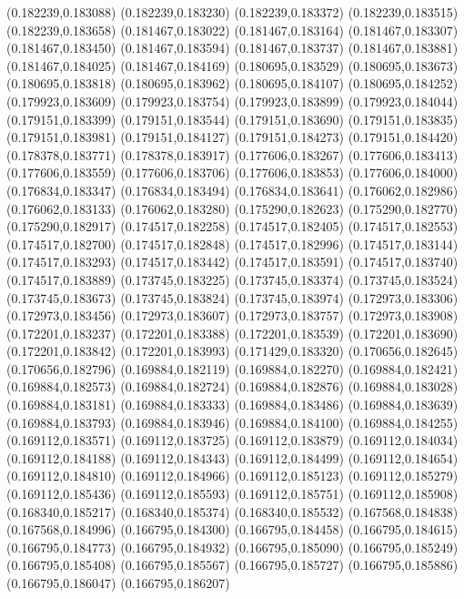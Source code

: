 (0.182239,0.183088)
(0.182239,0.183230)
(0.182239,0.183372)
(0.182239,0.183515)
(0.182239,0.183658)
(0.181467,0.183022)
(0.181467,0.183164)
(0.181467,0.183307)
(0.181467,0.183450)
(0.181467,0.183594)
(0.181467,0.183737)
(0.181467,0.183881)
(0.181467,0.184025)
(0.181467,0.184169)
(0.180695,0.183529)
(0.180695,0.183673)
(0.180695,0.183818)
(0.180695,0.183962)
(0.180695,0.184107)
(0.180695,0.184252)
(0.179923,0.183609)
(0.179923,0.183754)
(0.179923,0.183899)
(0.179923,0.184044)
(0.179151,0.183399)
(0.179151,0.183544)
(0.179151,0.183690)
(0.179151,0.183835)
(0.179151,0.183981)
(0.179151,0.184127)
(0.179151,0.184273)
(0.179151,0.184420)
(0.178378,0.183771)
(0.178378,0.183917)
(0.177606,0.183267)
(0.177606,0.183413)
(0.177606,0.183559)
(0.177606,0.183706)
(0.177606,0.183853)
(0.177606,0.184000)
(0.176834,0.183347)
(0.176834,0.183494)
(0.176834,0.183641)
(0.176062,0.182986)
(0.176062,0.183133)
(0.176062,0.183280)
(0.175290,0.182623)
(0.175290,0.182770)
(0.175290,0.182917)
(0.174517,0.182258)
(0.174517,0.182405)
(0.174517,0.182553)
(0.174517,0.182700)
(0.174517,0.182848)
(0.174517,0.182996)
(0.174517,0.183144)
(0.174517,0.183293)
(0.174517,0.183442)
(0.174517,0.183591)
(0.174517,0.183740)
(0.174517,0.183889)
(0.173745,0.183225)
(0.173745,0.183374)
(0.173745,0.183524)
(0.173745,0.183673)
(0.173745,0.183824)
(0.173745,0.183974)
(0.172973,0.183306)
(0.172973,0.183456)
(0.172973,0.183607)
(0.172973,0.183757)
(0.172973,0.183908)
(0.172201,0.183237)
(0.172201,0.183388)
(0.172201,0.183539)
(0.172201,0.183690)
(0.172201,0.183842)
(0.172201,0.183993)
(0.171429,0.183320)
(0.170656,0.182645)
(0.170656,0.182796)
(0.169884,0.182119)
(0.169884,0.182270)
(0.169884,0.182421)
(0.169884,0.182573)
(0.169884,0.182724)
(0.169884,0.182876)
(0.169884,0.183028)
(0.169884,0.183181)
(0.169884,0.183333)
(0.169884,0.183486)
(0.169884,0.183639)
(0.169884,0.183793)
(0.169884,0.183946)
(0.169884,0.184100)
(0.169884,0.184255)
(0.169112,0.183571)
(0.169112,0.183725)
(0.169112,0.183879)
(0.169112,0.184034)
(0.169112,0.184188)
(0.169112,0.184343)
(0.169112,0.184499)
(0.169112,0.184654)
(0.169112,0.184810)
(0.169112,0.184966)
(0.169112,0.185123)
(0.169112,0.185279)
(0.169112,0.185436)
(0.169112,0.185593)
(0.169112,0.185751)
(0.169112,0.185908)
(0.168340,0.185217)
(0.168340,0.185374)
(0.168340,0.185532)
(0.167568,0.184838)
(0.167568,0.184996)
(0.166795,0.184300)
(0.166795,0.184458)
(0.166795,0.184615)
(0.166795,0.184773)
(0.166795,0.184932)
(0.166795,0.185090)
(0.166795,0.185249)
(0.166795,0.185408)
(0.166795,0.185567)
(0.166795,0.185727)
(0.166795,0.185886)
(0.166795,0.186047)
(0.166795,0.186207)
